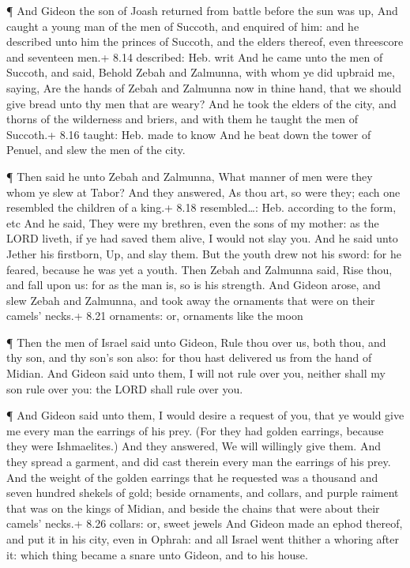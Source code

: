  ¶ And Gideon the son of Joash returned from battle before
the sun was up,  And caught a young man of the men of
Succoth, and enquired of him: and he described unto him the princes of
Succoth, and the elders thereof, even threescore and seventeen men.+
8.14 described: Heb. writ  And he came unto the men of
Succoth, and said, Behold Zebah and Zalmunna, with whom ye did upbraid
me, saying, Are the hands of Zebah and Zalmunna now in thine hand, that
we should give bread unto thy men that are weary?  And he
took the elders of the city, and thorns of the wilderness and briers,
and with them he taught the men of Succoth.+ 8.16 taught: Heb. made to
know  And he beat down the tower of Penuel, and slew the
men of the city.

 ¶ Then said he unto Zebah and Zalmunna, What manner of men
were they whom ye slew at Tabor? And they answered, As thou art, so were
they; each one resembled the children of a king.+ 8.18 resembled\ldots:
Heb. according to the form, etc  And he said, They were my
brethren, even the sons of my mother: as the LORD liveth, if ye had
saved them alive, I would not slay you.  And he said unto
Jether his firstborn, Up, and slay them. But the youth drew not his
sword: for he feared, because he was yet a youth.  Then
Zebah and Zalmunna said, Rise thou, and fall upon us: for as the man is,
so is his strength. And Gideon arose, and slew Zebah and Zalmunna, and
took away the ornaments that were on their camels' necks.+ 8.21
ornaments: or, ornaments like the moon

 ¶ Then the men of Israel said unto Gideon, Rule thou over
us, both thou, and thy son, and thy son's son also: for thou hast
delivered us from the hand of Midian.  And Gideon said unto
them, I will not rule over you, neither shall my son rule over you: the
LORD shall rule over you.

 ¶ And Gideon said unto them, I would desire a request of
you, that ye would give me every man the earrings of his prey. (For they
had golden earrings, because they were Ishmaelites.)  And
they answered, We will willingly give them. And they spread a garment,
and did cast therein every man the earrings of his prey. 
And the weight of the golden earrings that he requested was a thousand
and seven hundred shekels of gold; beside ornaments, and collars, and
purple raiment that was on the kings of Midian, and beside the chains
that were about their camels' necks.+ 8.26 collars: or, sweet jewels
 And Gideon made an ephod thereof, and put it in his city,
even in Ophrah: and all Israel went thither a whoring after it: which
thing became a snare unto Gideon, and to his house.

